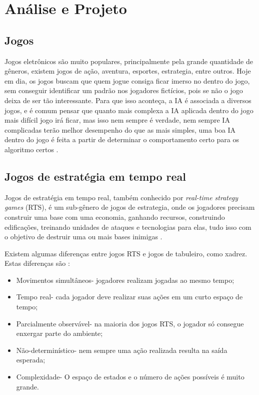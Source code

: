 \chapter{\label{chap:ativ}Análise e Projeto}

\section{Jogos}
 Jogos eletrônicos são muito populares, principalmente pela grande quantidade de gêneros, existem jogos de ação, aventura, esportes, estrategia, entre outros. Hoje em dia, os jogos buscam que quem jogue consiga ficar imerso no dentro do jogo, sem conseguir identificar um padrão nos jogadores fictícios, pois se não o jogo deixa de ser tão interessante. Para que isso aconteça, a IA é associada a diversos jogos, e é comum pensar que quanto mais complexa a IA aplicada dentro do jogo mais difícil jogo irá ficar, mas isso nem sempre é verdade, nem sempre IA complicadas terão melhor desempenho do que as mais simples, uma boa IA dentro do jogo é feita a partir de determinar o comportamento certo para os algoritmo certos \cite{millington2009artificial}.
 
 \section{Jogos de estratégia em tempo real}
 
 Jogos de estratégia em tempo real, também conhecido por \textit{real-time strategy games} (RTS), é um sub-gênero de jogos de estrategia, onde os jogadores precisam construir uma base com uma economia, ganhando recursos, construindo edificações, treinando unidades de ataques e tecnologias para elas, tudo isso com o objetivo de destruir uma ou mais bases inimigas \cite{ontanon2013survey, buro2012real}. 
 
 Existem algumas diferenças entre jogos RTS e jogos de tabuleiro, como xadrez. Estas diferenças são \cite{ontanon2013survey}:
 
 \begin{itemize}
 	\item Movimentos simultâneos- jogadores realizam jogadas ao mesmo tempo;
 	\item Tempo real- cada jogador deve realizar suas ações em um curto espaço de tempo;
 	\item Parcialmente observável- na maioria dos jogos RTS, o jogador só consegue enxergar parte do ambiente;
 	\item Não-determinístico- nem sempre uma ação realizada resulta  na saída esperada;
 	\item Complexidade- O espaço de estados e o número de ações possíveis é muito grande.
 \end{itemize} 
 
